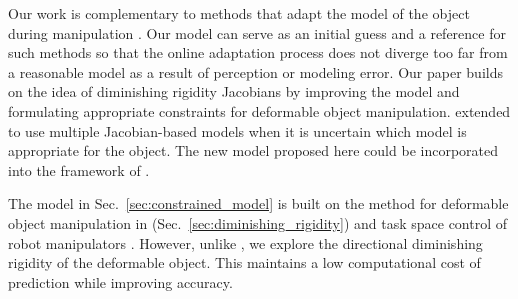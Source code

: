 Our work is complementary to methods that adapt the model of the object during manipulation \cite{Navarro-Alarcon2014, NavarroAlarcon2018, Hu2018deformable_gpr}. Our model can serve as an initial guess and a reference for such methods so that the online adaptation process does not diverge too far from a reasonable model as a result of perception or modeling error. 
Our paper builds on the idea of diminishing rigidity Jacobians \cite{Berenson2013} by improving the model and formulating appropriate constraints for deformable object manipulation. \cite{McConachie2018} extended \cite{Berenson2013} to use multiple Jacobian-based models when it is uncertain which model is appropriate for the object. The new model proposed here could be incorporated into the framework of \cite{McConachie2018}. 


The model in Sec.~\ref{sec:constrained_model} is built on the method for deformable object manipulation in \cite{Berenson2013} (Sec.~\ref{sec:diminishing_rigidity}) and task space control of robot manipulators \cite{Khatib1987}.
However, unlike \cite{Berenson2013}, we explore the directional diminishing rigidity of the deformable object. This maintains a low computational cost of prediction while improving accuracy.
